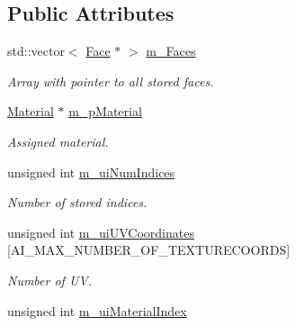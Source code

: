 \subsection*{Public Attributes}
\begin{DoxyCompactItemize}
\item 
\hypertarget{struct_assimp_1_1_obj_file_1_1_mesh_aa841ed9264e18e5089b4af8c365a3263}{std\+::vector$<$ \hyperlink{struct_assimp_1_1_obj_file_1_1_face}{Face} $\ast$ $>$ \hyperlink{struct_assimp_1_1_obj_file_1_1_mesh_aa841ed9264e18e5089b4af8c365a3263}{m\+\_\+\+Faces}}\label{struct_assimp_1_1_obj_file_1_1_mesh_aa841ed9264e18e5089b4af8c365a3263}

\begin{DoxyCompactList}\small\item\em Array with pointer to all stored faces. \end{DoxyCompactList}\item 
\hypertarget{struct_assimp_1_1_obj_file_1_1_mesh_a60adcbc24876f68e26ea88529004d13c}{\hyperlink{struct_assimp_1_1_obj_file_1_1_material}{Material} $\ast$ \hyperlink{struct_assimp_1_1_obj_file_1_1_mesh_a60adcbc24876f68e26ea88529004d13c}{m\+\_\+p\+Material}}\label{struct_assimp_1_1_obj_file_1_1_mesh_a60adcbc24876f68e26ea88529004d13c}

\begin{DoxyCompactList}\small\item\em Assigned material. \end{DoxyCompactList}\item 
\hypertarget{struct_assimp_1_1_obj_file_1_1_mesh_a27ad962ef7fbaaec29131717921b7518}{unsigned int \hyperlink{struct_assimp_1_1_obj_file_1_1_mesh_a27ad962ef7fbaaec29131717921b7518}{m\+\_\+ui\+Num\+Indices}}\label{struct_assimp_1_1_obj_file_1_1_mesh_a27ad962ef7fbaaec29131717921b7518}

\begin{DoxyCompactList}\small\item\em Number of stored indices. \end{DoxyCompactList}\item 
\hypertarget{struct_assimp_1_1_obj_file_1_1_mesh_a4c82ced333b9be1e59b80687ef4e6f3a}{unsigned int \hyperlink{struct_assimp_1_1_obj_file_1_1_mesh_a4c82ced333b9be1e59b80687ef4e6f3a}{m\+\_\+ui\+U\+V\+Coordinates} \mbox{[}A\+I\+\_\+\+M\+A\+X\+\_\+\+N\+U\+M\+B\+E\+R\+\_\+\+O\+F\+\_\+\+T\+E\+X\+T\+U\+R\+E\+C\+O\+O\+R\+D\+S\mbox{]}}\label{struct_assimp_1_1_obj_file_1_1_mesh_a4c82ced333b9be1e59b80687ef4e6f3a}

\begin{DoxyCompactList}\small\item\em Number of U\+V. \end{DoxyCompactList}\item 
\hypertarget{struct_assimp_1_1_obj_file_1_1_mesh_a5a878356aff22bebb10d8cd039fc4052}{unsigned int \hyperlink{struct_assimp_1_1_obj_file_1_1_mesh_a5a878356aff22bebb10d8cd039fc4052}{m\+\_\+ui\+Material\+Index}}\label{struct_assimp_1_1_obj_file_1_1_mesh_a5a878356aff22bebb10d8cd039fc4052}


\end{DoxyCompactItemize}
